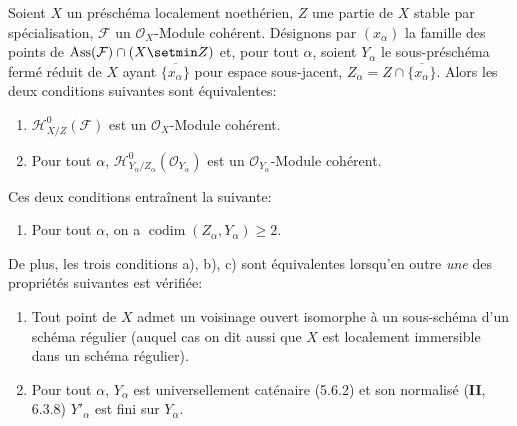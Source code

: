 \begin{proposition}[5.11.1]
\label{IV.2.s5.11.1-fr}
Soient $X$ un préschéma localement noethérien, $Z$ une partie de $X$ stable par
spécialisation, $\mathcal F$ un $\mathcal O_X$-Module cohérent. Désignons par
$(x_\alpha)$ la famille des points de
$\operatorname{Ass}(\mathcal F)\cap(X\setmin Z)$ et, pour tout $\alpha$, soient
$Y_\alpha$ le sous-préschéma fermé réduit de $X$ ayant
$\overline{\{x_\alpha\}}$ pour espace sous-jacent,
$Z_\alpha=Z\cap\overline{\{x_\alpha\}}$. Alors les deux conditions suivantes
sont équivalentes:
\begin{enumerate}
\item[\textup{a)}] $\mathcal H^0_{X/Z}(\mathcal F)$ est un $\mathcal O_X$-Module
cohérent.
\item[\textup{b)}] Pour tout $\alpha$,
$\mathcal H^0_{Y_\alpha/Z_\alpha}(\mathcal O_{Y_\alpha})$ est un
$\mathcal O_{Y_\alpha}$-Module cohérent.
\end{enumerate}
Ces deux conditions entraînent la suivante:
\begin{enumerate}
\item[\textup{c)}] Pour tout $\alpha$, on a
$\operatorname{codim}(Z_\alpha,Y_\alpha)\geq2$.
\end{enumerate}
De plus, les trois conditions \textup{a), b), c)} sont équivalentes lorsqu'en outre \emph{une}
des propriétés suivantes est vérifiée:
\begin{enumerate}
\item[\textup{(i)}] Tout point de $X$ admet un voisinage ouvert isomorphe à un
sous-schéma d'un schéma régulier \textup{(auquel cas on dit aussi que $X$ est}
localement immersible dans un schéma régulier\textup{)}.
\item[\textup{(ii)}] Pour tout $\alpha$, $Y_\alpha$ est universellement caténaire
\textup{(5.6.2)} et son normalisé \textup{(\textbf{II}, 6.3.8)} $Y'_\alpha$ est fini sur $Y_\alpha$.
\end{enumerate}
\end{proposition}

